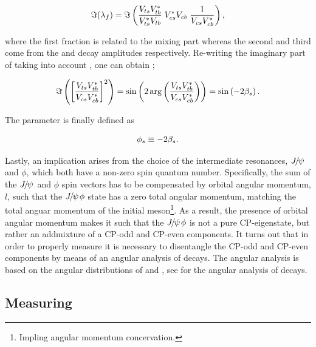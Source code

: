 \begin{equation}
  \centering
 \Im(\lambda_f) = \Im\parenthesis{ \frac{\Vts\Vtb^*}{\Vts^*\Vtb} \; \Vcs^*\Vcb \; \frac{1}{\Vcs\Vcb^*} },
 \label{lambdaf_ckm}
\end{equation}

\noindent where the first fraction is related to the mixing part \qoverp whereas the second and third come from the \Bsb and \Bs
decay amplitudes respectively. Re-writing the imaginary part of  taking into account ,
one can obtain ;

\begin{equation}
  \centering
  \Im\parenthesis{ \brackets{ \frac{\Vts\Vtb^*}{\Vcs\Vcb^*}}^2 } =
  \sin \parenthesis{2 \arg \parenthesis{\frac{\Vts\Vtb^*}{\Vcs\Vcb^*}}} =
  \sin \parenthesis{-2\betas}.
 \label{lambda_ckm_manip}
\end{equation}

\noindent The parameter \phis is finally defined as

\begin{equation}
  \centering
  \phis\equiv-2\betas.
 \label{phis_def}
\end{equation}

\noindent Lastly, an implication arises from the choice of the intermediate resonances, ${J\mskip -3mu/\mskip -2mu\psi\mskip 2mu}$ and $\phi$,
which both have a non-zero spin quantum number. Specifically, the sum of the ${J\mskip -3mu/\mskip -2mu\psi\mskip 2mu}$ and $\phi$ spin vectors
has to be compensated by orbital angular momentum, $l$, such that the ${J\mskip -3mu/\mskip -2mu\psi\mskip 2mu}\phi$ state has a zero total
angular momentum, matching the total anguar momentum of the initial \Bs meson\footnote{Impling angular momentum concervation.}.
As a result, the presence of orbital angular momentum makes it such that the ${J\mskip -3mu/\mskip -2mu\psi\mskip 2mu}\phi$ is not a pure CP-eigenstate,
but rather an addmixture of a CP-odd and CP-even components.
It turns out that in order to properly measure \phis it is necessary to disentangle the CP-odd and CP-even
components by means of an angular analysis of \BsJpsiPhi decays. The angular analysis is based on the
angular distributions of \phiKK and \Jpsimumu, see  for the angular analysis
of \BsJpsiKst decays.

\subsection{Measuring \phis}
\label{measuring_phis}

